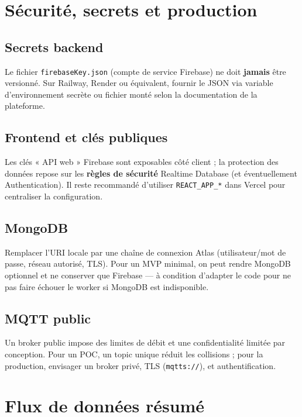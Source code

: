 \documentclass[11pt,a4paper]{article}
\begin{document}
\section{Sécurité, secrets et production}

\subsection{Secrets backend}

Le fichier \texttt{firebaseKey.json} (compte de service Firebase) ne doit \textbf{jamais} être versionné. Sur Railway, Render ou équivalent, fournir le JSON via variable d'environnement secrète ou fichier monté selon la documentation de la plateforme.

\subsection{Frontend et clés publiques}

Les clés « API web » Firebase sont exposables côté client ; la protection des données repose sur les \textbf{règles de sécurité} Realtime Database (et éventuellement Authentication). Il reste recommandé d'utiliser \texttt{REACT\_APP\_*} dans Vercel pour centraliser la configuration.

\subsection{MongoDB}

Remplacer l'URI locale par une chaîne de connexion Atlas (utilisateur/mot de passe, réseau autorisé, TLS). Pour un MVP minimal, on peut rendre MongoDB optionnel et ne conserver que Firebase — à condition d'adapter le code pour ne pas faire échouer le worker si MongoDB est indisponible.

\subsection{MQTT public}

Un broker public impose des limites de débit et une confidentialité limitée par conception. Pour un POC, un topic unique réduit les collisions ; pour la production, envisager un broker privé, TLS (\texttt{mqtts://}), et authentification.

\section{Flux de données résumé}
\end{document}
